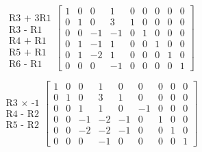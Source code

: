 \documentclass[12pt, a4paper, twoside, openright]{book}
\begin{document}
\begin{equation*}
\begin{matrix}
\\
\text{R3 + 3R1}\\
\text{R3 - R1} \\
\text{R4 + R1} \\
\text{R5 + R1} \\
\text{R6 - R1}
\end{matrix}
\begin{bmatrix}
1  &  0  &  0  &  1  &  0  &  0  &  0  &  0  &  0 \\
0  &  1  &  0  &  3  &  1  &  0  &  0  &  0  &  0 \\
0  &  0  & -1  & -1  &  0  &  1  &  0  &  0  &  0 \\
0  &  1  & -1  &  1  &  0  &  0  &  1  &  0  &  0 \\
0  &  1  & -2  &  1  &  0  &  0  &  0  &  1  &  0 \\
0  &  0  &  0  & -1  &  0  &  0  &  0  &  0  &  1
\end{bmatrix}
\end{equation*}

\begin{equation*}
\begin{matrix}
\\
\\
\text{R3 $\times$ -1} \\
\text{R4 - R2} \\
\text{R5 - R2} \\
\\
\end{matrix}
\begin{bmatrix}
1  &  0  &  0  &  1  &  0  &  0  &  0  &  0  &  0 \\
0  &  1  &  0  &  3  &  1  &  0  &  0  &  0  &  0 \\
0  &  0  &  1  &  1  &  0  & -1  &  0  &  0  &  0 \\
0  &  0  & -1  & -2  & -1  &  0  &  1  &  0  &  0 \\
0  &  0  & -2  & -2  & -1  &  0  &  0  &  1  &  0 \\
0  &  0  &  0  & -1  &  0  &  0  &  0  &  0  &  1
\end{bmatrix}
\end{equation*}
\end{document}
